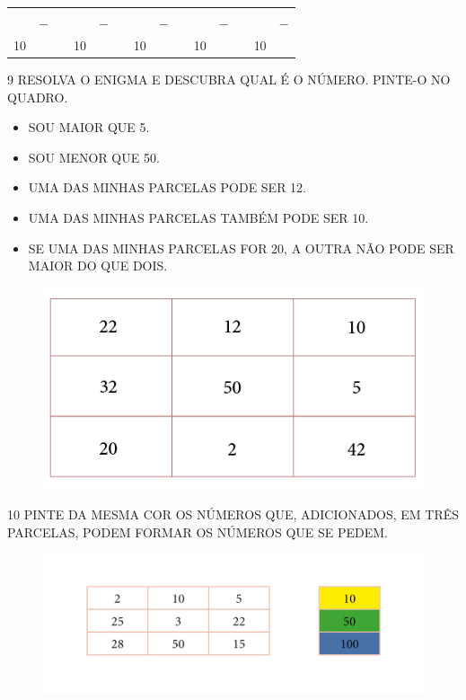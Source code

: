 \begin{center}
\begin{tabular}{llllllllllllll}
\mbox{} &  &  & \mbox{} &  &  & \mbox{} &  &  & \mbox{} &  &  & \mbox{} &  \\
\mbox{} & $-$ &  & \mbox{} & $-$ &  & \mbox{} & $-$ &  & \mbox{} & $-$ &  & \mbox{} & $-$ \\ \cline{1-1} \cline{4-4} \cline{7-7} \cline{10-10} \cline{13-13}
10 &  &  & 10 &  &  & 10 &  &  & 10 &  &  & 10 & 
\end{tabular}
\end{center}

\pagebreak
\num{9} RESOLVA O ENIGMA E DESCUBRA QUAL É O NÚMERO. PINTE-O NO QUADRO.

\begin{itemize}
\item SOU MAIOR QUE 5.

\item SOU MENOR QUE 50.

\item UMA DAS MINHAS PARCELAS PODE SER 12.

\item UMA DAS MINHAS PARCELAS TAMBÉM PODE SER 10.

\item SE UMA DAS MINHAS PARCELAS FOR 20, A OUTRA NÃO PODE SER MAIOR DO QUE DOIS.
\end{itemize}

\begin{figure}[htpb!]
\centering
\includegraphics[width=.5\textwidth]{../ilustracoes/MAT1/SAEB_1ANO_MAT_FIGURA25.png}
\end{figure}


\num{10} PINTE DA MESMA COR OS NÚMEROS QUE, ADICIONADOS, EM TRÊS PARCELAS, PODEM
FORMAR OS NÚMEROS QUE SE PEDEM.

\begin{figure}[htpb!]
\includegraphics[width=\textwidth]{../ilustracoes/MAT1/SAEB_1ANO_MAT_FIGURA26.png}
\end{figure}

